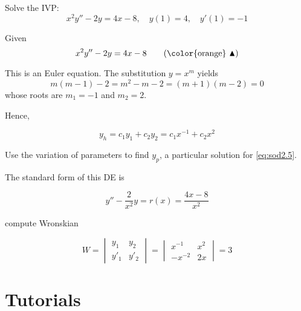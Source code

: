 \begin{example}
    Solve the IVP:
    \[
        x^2y'' - 2y = 4x - 8, \quad y(1) = 4, \quad y'(1) = -1
    \]
\end{example}
\begin{solution}
    Given 
    \begin{equation}
        x^2y'' - 2y = 4x - 8 \label{eq:sod2.5} \tag{{\color{orange} $\blacktriangle$}}
    \end{equation}

    This is an Euler equation. The substitution $y = x^m$ yields 
    \[
        m(m-1) - 2 = m^2 - m - 2 = (m+1)(m-2) = 0
    \]
    whose roots are $m_1 = -1$ and $m_2 = 2$.

    Hence, 

    \[
        y_h = c_1 y_1 + c_2 y_2 = c_1 x^{-1} + c_2x^2
    \]

    Use the variation of parameters to find $y_p$, a particular solution for \eqref{eq:sod2.5}.

    The standard form of this DE is 

    \[
        y'' - \frac{2}{x^2}y = r(x) = \frac{4x - 8}{x^2}
    \]

    compute Wronskian

    \[
        W = \begin{vmatrix}
            y_1 & y_2\\ y'_1 & y'_2
        \end{vmatrix}
        = \begin{vmatrix}
            x^{-1} & x^2 \\ -x^{-2} & 2x 
        \end{vmatrix} = 3
    \]

\end{solution}

\section{Tutorials}

